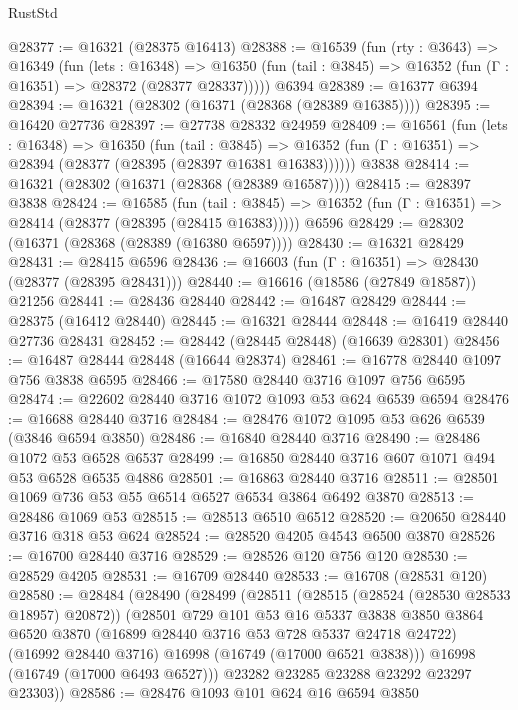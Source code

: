 \begin{lexlean}{RustStd}
\begin{coremodule}
@28377 := @16321 (@28375 @16413)
@28388 := @16539
    (fun (rty : @3643) =>
    @16349
      (fun (lets : @16348) =>
      @16350 (fun (tail : @3845) => @16352 (fun (Γ : @16351) => @28372 (@28377 @28337)))))
    @6394
@28389 := @16377 @6394
@28394 := @16321 (@28302 (@16371 (@28368 (@28389 @16385))))
@28395 := @16420 @27736
@28397 := @27738 @28332 @24959
@28409 := @16561
    (fun (lets : @16348) =>
    @16350
      (fun (tail : @3845) =>
      @16352 (fun (Γ : @16351) => @28394 (@28377 (@28395 (@28397 @16381 @16383))))))
    @3838
@28414 := @16321 (@28302 (@16371 (@28368 (@28389 @16587))))
@28415 := @28397 @3838
@28424 := @16585
    (fun (tail : @3845) => @16352 (fun (Γ : @16351) => @28414 (@28377 (@28395 (@28415 @16383)))))
    @6596
@28429 := @28302 (@16371 (@28368 (@28389 (@16380 @6597))))
@28430 := @16321 @28429
@28431 := @28415 @6596
@28436 := @16603 (fun (Γ : @16351) => @28430 (@28377 (@28395 @28431)))
@28440 := @16616 (@18586 (@27849 @18587)) @21256
@28441 := @28436 @28440
@28442 := @16487 @28429
@28444 := @28375 (@16412 @28440)
@28445 := @16321 @28444
@28448 := @16419 @28440 @27736 @28431
@28452 := @28442 (@28445 @28448) (@16639 @28301)
@28456 := @16487 @28444 @28448 (@16644 @28374)
@28461 := @16778 @28440 @1097 @756 @3838 @6595
@28466 := @17580 @28440 @3716 @1097 @756 @6595
@28474 := @22602 @28440 @3716 @1072 @1093 @53 @624 @6539 @6594
@28476 := @16688 @28440 @3716
@28484 := @28476 @1072 @1095 @53 @626 @6539 (@3846 @6594 @3850)
@28486 := @16840 @28440 @3716
@28490 := @28486 @1072 @53 @6528 @6537
@28499 := @16850 @28440 @3716 @607 @1071 @494 @53 @6528 @6535 @4886
@28501 := @16863 @28440 @3716
@28511 := @28501 @1069 @736 @53 @55 @6514 @6527 @6534 @3864 @6492 @3870
@28513 := @28486 @1069 @53
@28515 := @28513 @6510 @6512
@28520 := @20650 @28440 @3716 @318 @53 @624
@28524 := @28520 @4205 @4543 @6500 @3870
@28526 := @16700 @28440 @3716
@28529 := @28526 @120 @756 @120
@28530 := @28529 @4205
@28531 := @16709 @28440
@28533 := @16708 (@28531 @120)
@28580 := @28484
    (@28490
      (@28499
        (@28511
          (@28515 (@28524 (@28530 @28533 @18957) @20872))
          (@28501
            @729
            @101
            @53
            @16
            @5337
            @3838
            @3850
            @3864
            @6520
            @3870
            (@16899 @28440 @3716 @53 @728 @5337 @24718 @24722)
            (@16992 @28440 @3716)
            @16998
            (@16749 (@17000 @6521 @3838)))
          @16998
          (@16749 (@17000 @6493 @6527)))
        @23282
        @23285
        @23288
        @23292
        @23297
        @23303))
@28586 := @28476 @1093 @101 @624 @16 @6594 @3850

\end{coremodule}
\end{lexlean}
